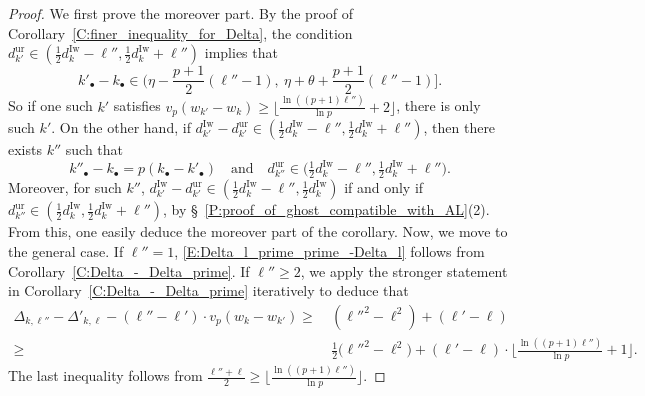 \begin{proof}
    We first prove the moreover part. By the proof of Corollary~\ref{C:finer_inequality_for_Delta}, the condition $d_{k'}^{\mathrm{ur}}\in (\frac 12d_k^{\mathrm{Iw}}- \ell'', \frac 12d_k^{\mathrm{Iw}}+\ell'')$ implies that
    $$
    k'_\bullet - k_\bullet \in \Big( \eta-\frac{p+1}2(\ell''-1), \ \eta+\theta + \frac{p+1}2 (\ell''-1)\Big].
    $$
    So if one such $k'$ satisfies $v_p(w_{k'}-w_k) \geq \big\lfloor \frac{\ln((p+1)\ell'')}{\ln p}+2\big\rfloor $, there is only such $k'$.  On the other hand, if $d_{k'}^{\mathrm{Iw}}- d_{k'}^{\mathrm{ur}}\in (\frac 12d_k^{\mathrm{Iw}}- \ell'', \frac 12d_k^{\mathrm{Iw}}+\ell'')$, then there exists $k''$ such that
    $$
    k''_\bullet - k_\bullet = p(k_\bullet - k'_\bullet) \quad \textrm{and} \quad d_{k''}^{\mathrm{ur}}\in \big(\tfrac 12d_k^{\mathrm{Iw}}- \ell'', \tfrac 12d_k^{\mathrm{Iw}}+\ell''\big).
    $$
    Moreover, for such $k''$, $d_{k'}^{\mathrm{Iw}}-d_{k'}^{\mathrm{ur}}\in (\frac 12d_k^{\mathrm{Iw}}- \ell'', \frac 12d_k^{\mathrm{Iw}})$ if and only if $d_{k''}^{\mathrm{ur}}\in (\frac 12d_k^{\mathrm{Iw}}, \frac 12d_k^{\mathrm{Iw}}+ \ell'')$, by \S~\ref{P:proof_of_ghost_compatible_with_AL}(2). From this, one easily deduce the moreover part of the corollary.
    Now, we move to the general case.
    If $\ell'' = 1$, \eqref{E:Delta_l_prime_prime_-Delta_l} follows from Corollary~\ref{C:Delta_-_Delta_prime}.
    If $\ell'' \geq 2$, we apply the stronger statement in  Corollary~\ref{C:Delta_-_Delta_prime} iteratively to deduce that
    \begin{align*}
    \Delta_{k, \ell''}-\Delta'_{k,\ell} - (\ell''-\ell')\cdot v_p(w_k-w_{k'}) \geq\ & (\ell''^2-\ell^2) + (\ell'-\ell)
    \\
    \geq\ & \frac 12\big( \ell''^2 - \ell^2\big)+ (\ell'-\ell) \cdot \Big\lfloor \frac{\ln((p+1)\ell'')}{\ln p}+1\Big\rfloor.
    \end{align*}
    The last inequality follows from $\frac{\ell''+\ell}2 \geq \big\lfloor \frac{\ln((p+1)\ell'')}{\ln p}\big\rfloor$.
\end{proof}

